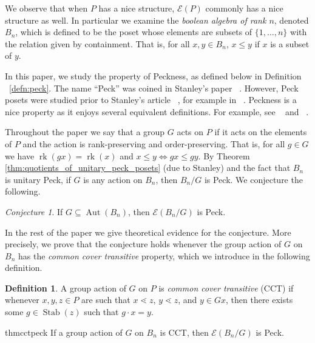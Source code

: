 \documentclass[smallextended, envcountsame, numbook]{svjour3}
\theoremstyle{plain}
\theoremstyle{definition}
\newtheorem{defn}[thm]{Definition}
\theoremstyle{remark}
\newtheorem{conj}[thm]{Conjecture}
\numberwithin{equation}{section}
\renewcommand{\iff}{\Leftrightarrow}
\newcommand\rk{\operatorname{rk}}
\newcommand\Stab{\operatorname{Stab}}
\newcommand\Aut{\operatorname{Aut}}
\begin{document}
We observe that when $P$ has a nice structure, $\mathcal E(P)$ commonly has a nice structure as well.  In particular we examine the \textit{boolean algebra of rank $n$}, denoted $B_n$, which is defined to be the poset whose elements are subsets of $\{1,\ldots,n\}$ with the relation given by containment.  That is, for all $x,y\in B_n$, $x\le y$ if $x$ is a subset of $y$.

In this paper, we study the property of Peckness, as defined below
in Definition ~\ref{defn:peck}. The name 
``Peck'' was coined in Stanley's paper ~\cite{quotients_stanley}. However, Peck posets were studied prior to Stanley's article ~\cite{quotients_stanley}, for example in
~\cite{weyl_groups_stanley}. Peckness is a nice property
as it enjoys several equivalent definitions.  For example, see
~\cite[Lemma 1.1]{weyl_groups_stanley} and ~\cite{proctor}.

Throughout the paper we say that a group $G$ acts on $P$ if it acts on the elements of $P$ and the action is rank-preserving and order-preserving.  That is, for all $g \in G$ we have $\rk(gx) = \rk(x)$ and $x \leq y \iff gx \leq gy$. 
By Theorem \ref{thm:quotients_of_unitary_peck_posets} (due to Stanley) and the fact that $B_n$ is unitary Peck, if $G$ is any action on $B_n$, then $B_n/G$ is Peck.  We conjecture the following.

\begin{conj}\label{conj:F_of_BnG_Peck}
If $G \subseteq \Aut(B_n)$, then $\mathcal E(B_n/G)$ is Peck.
\end{conj}

In the rest of the paper we give theoretical evidence for the conjecture. More precisely, we prove that the conjecture holds whenever the group action of $G$ on $B_n$ has the \emph{common cover transitive} property, which we introduce in the following definition.

\begin{defn}
\label{defn:cover_transitive}
A group action of $G$ on $P$ is \textit{common cover transitive} (CCT) if whenever $x,y,z\in P$ are such that $x\lessdot z$, $y\lessdot z$, and $y\in Gx$, then there exists some $g\in \Stab(z)$ such that $g\cdot x = y$.
\end{defn}

\begin{restatable}{thm}{cctpeck}
\label{thm:cover_transitive_implies_Peck}
If a group action of $G$ on $B_n$ is CCT, then $\mathcal E(B_n/G)$ is Peck.
\end{restatable}
\end{document}

